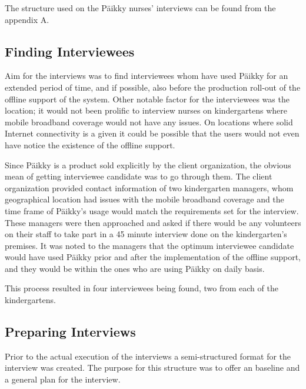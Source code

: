 The structure used on the Päikky nurses' interviews can be found from the appendix A. %



\subsection{Finding Interviewees}

Aim for the interviews was to find interviewees whom have used Päikky for an extended period of time, and if possible, also before the production roll-out of the offline support of the system. Other notable factor for the interviewees was the location; it would not been prolific to interview nurses on kindergartens where mobile broadband coverage would not have any issues. On locations where solid Internet connectivity is a given it could be possible that the users would not even have notice the existence of the offline support.

Since Päikky is a product sold explicitly by the client organization, the obvious mean of getting interviewee candidate was to go through them. The client organization provided contact information of two kindergarten managers, whom geographical location had issues with the mobile broadband coverage and the time frame of Päikky's usage would match the requirements set for the interview. These managers were then approached and asked if there would be any volunteers on their staff to take part in a 45 minute interview done on the kindergarten's premises. It was noted to the managers that the optimum interviewee candidate would have used Päikky prior and after the implementation of the offline support, and they would be within the ones who are using Päikky on daily basis.

This process resulted in four interviewees being found, two from each of the kindergartens. 




\subsection{Preparing Interviews}
Prior to the actual execution of the interviews a semi-structured format for the interview was created. The purpose for this structure was to offer an baseline and a general plan for the interview. 

